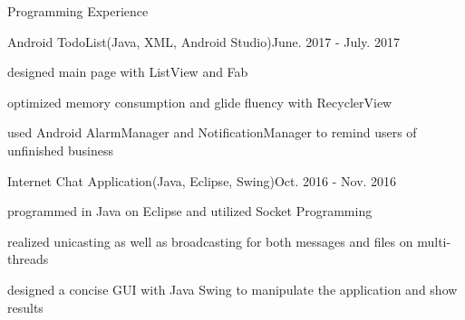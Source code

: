 \documentclass{resume} %
\begin{document}
\begin{rSection}{Programming Experience}
\begin{rSubsection}{Android TodoList(Java, XML, Android Studio)}{June. 2017 - July. 2017}{}{}
\item designed main page with ListView and Fab
\item optimized memory consumption and glide fluency with  RecyclerView
\item used Android AlarmManager and NotificationManager to remind users of unfinished business
\end{rSubsection}





\begin{rSubsection}{Internet Chat Application(Java, Eclipse, Swing)}{Oct. 2016 - Nov. 2016}{}{}
\item programmed in Java on Eclipse and utilized Socket Programming
\item realized unicasting as well as broadcasting for both messages and files on multi-threads
\item designed a concise GUI with Java Swing to manipulate the application and show results
\end{rSubsection}




\end{rSection}
\end{document}
